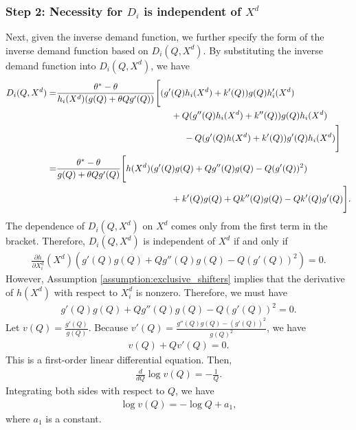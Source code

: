 \documentclass[11pt, a4paper]{article}
\theoremstyle{remark}
\begin{document}
\subsubsection*{Step 2: Necessity for $D_i$ is independent of $X^{d}$}
Next, given the inverse demand function, we further specify the form of the inverse demand function based on $D_i(Q, X^{d})$.
By substituting the inverse demand function into $D_i(Q, X^{d})$, we have
\begin{align}
    D_i(Q, X^{d}) = &\frac{\theta^{*} - \theta}{h_i(X^{d})(g(Q) + \theta Q g'(Q))}\Bigg[
    (g'(Q)h_i(X^{d}) + k'(Q) )g(Q)h_i'(X^{d})\\
    & \hspace{4.5cm} + Q(g''(Q)h_i(X^{d}) + k''(Q))g(Q)h_i(X^{d}) \\
    &\hspace{5cm} - Q(g'(Q)h(X^{d}) + k'(Q))g'(Q)h_i(X^{d})\Bigg]\\
    =&  \frac{\theta^{*} - \theta}{g(Q) + \theta Q g'(Q)}\Bigg[h(X^{d})(g'(Q)g(Q) + Qg{''}(Q)g(Q) - Q (g'(Q))^{2})\\
    & \hspace{4.5cm} + k'(Q)g(Q) + Qk''(Q)g(Q) - Qk'(Q)g'(Q)\Bigg].
\end{align}
The dependence of $D_i(Q, X^{d})$ on $X^{d}$ comes only from the first term in the bracket.
Therefore, $D_i(Q, X^{d})$ is independent of $X^{d}$ if and only if
\begin{align}
    \frac{\partial h}{\partial X^{d}_i}(X^{d})(g'(Q)g(Q) + Qg{''}(Q)g(Q) - Q (g'(Q))^{2}) = 0.
\end{align}
However, Assumption \ref{assumption:exclusive_shifters} implies that the derivative of $h(X^{d})$ with respect to $X^{d}_i$ is nonzero.
Therefore, we must have 
\begin{align}
    g'(Q)g(Q) + Qg{''}(Q)g(Q) - Q (g'(Q))^{2} = 0.
\end{align}
Let $v(Q) = \frac{g'(Q)}{g(Q)}$.
Because $v'(Q) = \frac{g''(Q)g(Q) - (g'(Q))^2}{g(Q)^2}$, we have
\begin{align}
    v(Q) + Qv'(Q) = 0.
\end{align}
This is a first-order linear differential equation.
Then, 
\begin{align}
    \frac{d }{d Q}\log v(Q) = -\frac{1}{Q}.
\end{align}
Integrating both sides with respect to $Q$, we have
\begin{align}
    \log v(Q) = -\log Q + a_1,
\end{align}
where $a_1$ is a constant.
\end{document}
